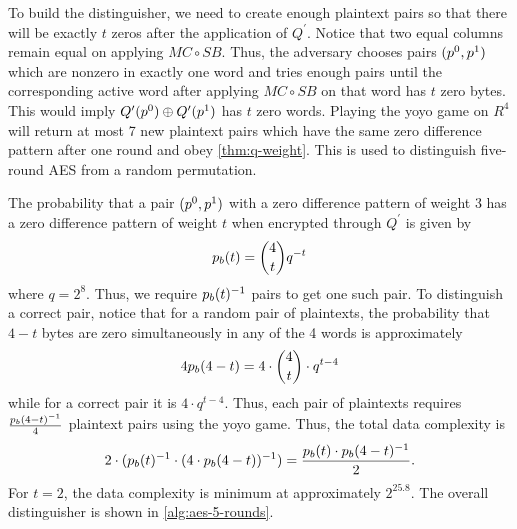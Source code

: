 \documentclass[twoside]{article}
\begin{document}
To build the distinguisher, we need to create enough plaintext pairs so that
there will be exactly \(t\) zeros after the application of \(Q^\prime\). Notice
that two equal columns remain equal on applying \(MC \circ SB\). Thus, the
adversary chooses pairs \((p^0, p^1)\) which are nonzero in exactly one
word and tries enough pairs until the corresponding active word after applying
\(MC \circ SB\) on that word has \(t\) zero bytes. This would imply
\(Q^\prime(p^0) \oplus Q^\prime(p^1)\) has \(t\) zero words. Playing
the yoyo game on \(R^4\) will return at most 7 new plaintext pairs which have
the same zero difference pattern after one round and obey
\autoref{thm:q-weight}. This is used to distinguish five-round AES from a random
permutation.

The probability that a pair \((p^0, p^1)\) with a zero difference pattern
of weight 3 has a zero difference pattern of weight \(t\) when encrypted through
\(Q^\prime\) is given by
\begin{equation}
    p_b(t) = \binom{4}{t}q^{-t}
\end{equation}
where \(q = 2^8\). Thus, we require \(p_b(t)^{-1}\) pairs to get one such
pair. To distinguish a correct pair, notice that for a random pair of
plaintexts, the probability that \(4 - t\) bytes are zero simultaneously in any
of the 4 words is approximately
\begin{equation}
    4p_b(4 - t) = 4 \cdot \binom{4}{t} \cdot q^{t - 4}
\end{equation}
while for a correct pair it is \(4 \cdot q^{t - 4}\). Thus, each pair of
plaintexts requires \(\frac{p_b(4 - t)^{-1}}{4}\) plaintext pairs using the
yoyo game. Thus, the total data complexity is
\begin{equation}
    2 \cdot (p_b(t)^{-1} \cdot (4 \cdot p_b(4 - t))^{-1}) = \frac{p_b(t) \cdot p_b(4 - t)^{-1}}{2}.
\end{equation}
For \(t = 2\), the data complexity is minimum at approximately \(2^{25.8}\). The
overall distinguisher is shown in \autoref{alg:aes-5-rounds}.
\end{document}
